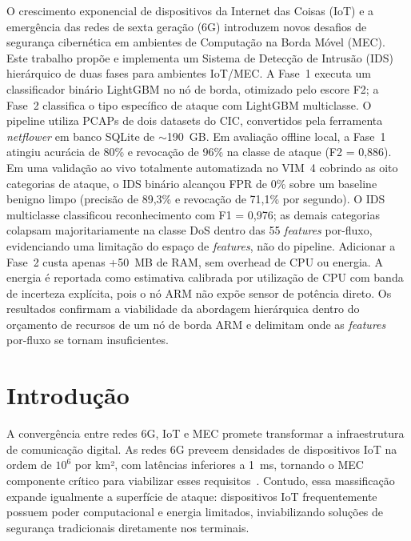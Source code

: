 \documentclass[12pt]{article}
\begin{document}
\begin{resumo}
O crescimento exponencial de dispositivos da Internet das Coisas (IoT) e a
emergência das redes de sexta geração (6G) introduzem novos desafios de
segurança cibernética em ambientes de Computação na Borda Móvel (MEC).
Este trabalho propõe e implementa um Sistema de Detecção de Intrusão (IDS)
hierárquico de duas fases para ambientes IoT/MEC. A Fase~1 executa um
classificador binário LightGBM no nó de borda, otimizado pelo escore F2; a
Fase~2 classifica o tipo específico de ataque com LightGBM multiclasse. O pipeline utiliza PCAPs de
dois datasets do CIC, convertidos pela ferramenta \textit{netflower} em banco
SQLite de $\sim$190~GB. Em avaliação offline local, a Fase~1 atingiu acurácia de
80\% e revocação de 96\% na classe de ataque (F2 = 0,886). Em uma validação ao
vivo totalmente automatizada no VIM~4 cobrindo as oito categorias de ataque, o
IDS binário alcançou FPR de 0\% sobre um baseline benigno limpo (precisão de
89,3\% e revocação de 71,1\% por segundo). O IDS multiclasse classificou
reconhecimento com F1 = 0,976; as demais categorias colapsam majoritariamente na
classe DoS dentro das 55 \textit{features} por-fluxo, evidenciando uma limitação
do espaço de \textit{features}, não do pipeline. Adicionar a Fase~2 custa apenas
+50~MB de RAM, sem overhead de CPU ou energia. A energia é reportada como
estimativa calibrada por utilização de CPU com banda de incerteza explícita,
pois o nó ARM não expõe sensor de potência direto. Os resultados confirmam a
viabilidade da abordagem hierárquica dentro do orçamento de recursos de um nó de
borda ARM e delimitam onde as \textit{features} por-fluxo se tornam
insuficientes.
\end{resumo}

\section{Introdução}

A convergência entre redes 6G, IoT e MEC promete transformar a infraestrutura
de comunicação digital. As redes 6G preveem densidades de dispositivos IoT na
ordem de $10^6$ por km², com latências inferiores a 1~ms, tornando o MEC
componente crítico para viabilizar esses requisitos~\cite{you:21}. Contudo,
essa massificação expande igualmente a superfície de ataque: dispositivos IoT
frequentemente possuem poder computacional e energia limitados, inviabilizando
soluções de segurança tradicionais diretamente nos terminais.
\end{document}

